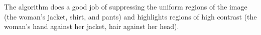 \documentclass{article}
\begin{document}
\begin{center}
\end{center}
The algorithm does a good job of suppressing the uniform regions of the image (the woman's jacket, shirt, and pants) and highlights regions of high contrast (the woman's hand against her jacket, hair against her head).
\end{document}
